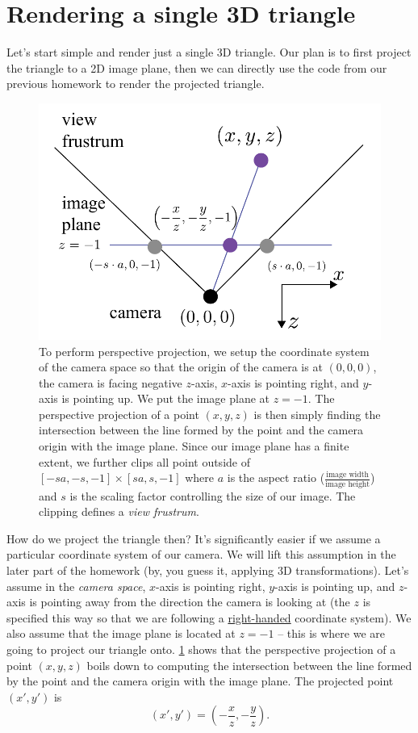 \section{Rendering a single 3D triangle}
Let's start simple and render just a single 3D triangle. Our plan is to first project the triangle to a 2D image plane, then we can directly use the code from our previous homework to render the projected triangle.

\begin{figure}[h]
    \centering
    \includegraphics[width=0.5\linewidth]{imgs/perspective_transform.pdf}
    \caption{To perform perspective projection, we setup the coordinate system of the camera space so that the origin of the camera is at $(0, 0, 0)$, the camera is facing negative $z$-axis, $x$-axis is pointing right, and $y$-axis is pointing up. We put the image plane at $z=-1$. The perspective projection of a point $(x, y, z)$ is then simply finding the intersection between the line formed by the point and the camera origin with the image plane. Since our image plane has a finite extent, we further clips all point outside of $[-sa, -s, -1] \times [sa, s, -1]$ where $a$ is the aspect ratio ($\frac{\text{image width}}{\text{image height}}$) and $s$ is the scaling factor controlling the size of our image. The clipping defines a \emph{view frustrum}.}
    \label{fig:perspective_transform}
\end{figure}

How do we project the triangle then? It's significantly easier if we assume a particular coordinate system of our camera. We will lift this assumption in the later part of the homework (by, you guess it, applying 3D transformations). Let's assume in the \emph{camera space}, $x$-axis is pointing right, $y$-axis is pointing up, and $z$-axis is pointing away from the direction the camera is looking at (the $z$ is specified this way so that we are following a \href{https://en.wikipedia.org/wiki/Right-hand_rule}{right-handed} coordinate system). We also assume that the image plane is located at $z=-1$ -- this is where we are going to project our triangle onto. \cref{fig:perspective_transform} shows that the perspective projection of a point $(x, y, z)$ boils down to computing the intersection between the line formed by the point and the camera origin with the image plane. The projected point $(x', y')$ is
\begin{equation}
\left(x', y'\right) = \left(-\frac{x}{z}, -\frac{y}{z}\right).
\label{eq:projection}
\end{equation}

